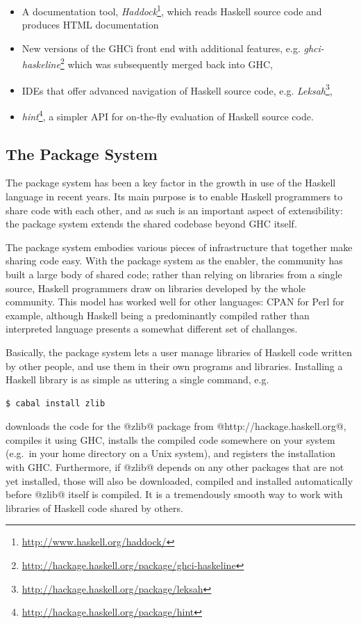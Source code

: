 \documentclass{article}
\begin{document}
{\begin{itemize}
\item A documentation tool,
\emph{Haddock}\footnote{\url{http://www.haskell.org/haddock/}}, which
reads Haskell source code and produces HTML documentation
\item New versions of the GHCi front end with additional features,
e.g. \emph{ghci-haskeline}\footnote{\url{http://hackage.haskell.org/package/ghci-haskeline}} which was subsequently merged back into GHC,
\item IDEs that offer advanced navigation of Haskell source code,
e.g. \emph{Leksah}\footnote{\url{http://hackage.haskell.org/package/leksah}},
\item \emph{hint}\footnote{\url{http://hackage.haskell.org/package/hint}}, a simpler API for on-the-fly evaluation of Haskell
  source code.
\end{itemize}

\subsection{The Package System}

The package system has been a key factor in the growth in use of the
Haskell language in recent years.  Its main purpose is to enable
Haskell programmers to share code with each other, and as such is an
important aspect of extensibility: the package system extends the
shared codebase beyond GHC itself.

The package system embodies various pieces of infrastructure that
together make sharing code easy.  With the package system as the
enabler, the community has built a large body of shared code; rather
than relying on libraries from a single source, Haskell programmers
draw on libraries developed by the whole community.  This model has
worked well for other languages: CPAN for Perl for example, although
Haskell being a predominantly compiled rather than interpreted
language presents a somewhat different set of challanges.

Basically, the package system lets a user manage libraries of Haskell
code written by other people, and use them in their own programs and
libraries.  Installing a Haskell library is as simple as uttering a
single command, e.g.

\begin{verbatim}
$ cabal install zlib
\end{verbatim}

\noindent downloads the code for the @zlib@ package from
@http://hackage.haskell.org@, compiles it using GHC, installs the
compiled code somewhere on your system (e.g.\ in your home directory
on a Unix system), and registers the installation with GHC.
Furthermore, if @zlib@ depends on any other packages that are not yet
installed, those will also be downloaded, compiled and installed
automatically before @zlib@ itself is compiled.  It is a tremendously
smooth way to work with libraries of Haskell code shared by others.

}
\end{document}

